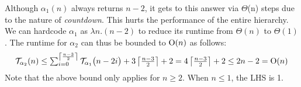 
\begin{rem}
Although $\alpha_1 (n)$ always returns $n-2$, it gets to this answer
via $\Theta$(n) steps due to the nature of \emph{countdown}.
This hurts the performance of the entire hierarchy. 
We can hardcode $\alpha_1$ as $\lambda n.(n-2)$ to reduce its runtime
from $\Theta(n)$ to $\Theta(1)$.
The runtime for $\alpha_2$ can thus be bounded to $\text{O}(n)$ as follows:
\begin{equation*}
\mathcal{T}_{\alpha_2}(n)
 \le \textstyle \sum_{i=0}^{\left\lceil \frac{n-3}{2} \right\rceil} \mathcal{T}_{\alpha_1}\big(n-2i\big) + 3\left\lceil \frac{n-3}{2} \right\rceil + 2  =  4\left\lceil \frac{n-3}{2} \right\rceil + 2
 \le 2n - 2 = \text{O}(n)
\end{equation*}
Note that the above bound only applies for $n\ge 2$. When $n\le 1$, the LHS is 1.
\end{rem}

